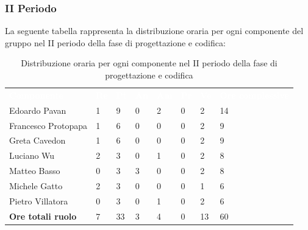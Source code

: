 \subsubsection{II Periodo}
La seguente tabella rappresenta la distribuzione oraria per ogni componente del gruppo nel II periodo della fase di progettazione e codifica:
\begin{table}[!htbp]
\begin{center}
\renewcommand{\arraystretch}{1.25}
\begin{tabular}{ m{}<{\centering}  m{}<{\centering} m{}<{\centering} m{}<{\centering}  m{}<{\centering}  m{}<{\centering}  m{}<{\centering}  m{}<{\centering}   }
	\rowcolor{darkblue}
	\textcolor{white}{\textbf{Componente}} &\textcolor{white}{\textbf{Re}}&\textcolor{white}{\textbf{Pt}}&\textcolor{white}{\textbf{An}}&\textcolor{white}{\textbf{Am}}&\textcolor{white}{\textbf{Pr}}&\textcolor{white}{\textbf{Ve}}&\textcolor{white}{\textbf{Ore complessive}}\\ 
	Edoardo Pavan & 1 & 9 & 0 & 2 & 0 & 2 & 14 \\	
	
	Francesco Protopapa & 1 & 6 & 0 & 0 & 0 & 2 & 9 \\

	Greta Cavedon & 1 & 6 & 0 & 0 & 0 & 2 & 9 \\
	
	Luciano Wu & 2 & 3 & 0 & 1 & 0 & 2 & 8 \\
	
	Matteo Basso & 0 & 3 & 3 & 0 & 0 & 2 & 8 \\
	
	Michele Gatto & 2 & 3 & 0 & 0 & 0 & 1 & 6 \\
	
	Pietro Villatora & 0 & 3 & 0 & 1 & 0 & 2 & 6 \\
	
	\textbf{Ore totali ruolo} & 7 & 33 & 3 & 4 & 0 & 13 & 60 \\

\end{tabular}
\caption{Distribuzione oraria per ogni componente nel II periodo della fase di progettazione e codifica}
\end{center}
\end{table}

